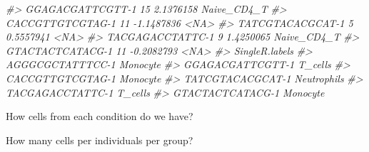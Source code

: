 \documentclass[
]{book}
\newenvironment{Shaded}{\begin{snugshade}}{\end{snugshade}}
\newcommand{\CommentTok}[1]{\textcolor[rgb]{0.56,0.35,0.01}{\textit{#1}}}
\newcommand{\FunctionTok}[1]{\textcolor[rgb]{0.13,0.29,0.53}{\textbf{#1}}}
\newcommand{\NormalTok}[1]{#1}
\newcommand{\SpecialCharTok}[1]{\textcolor[rgb]{0.81,0.36,0.00}{\textbf{#1}}}
\begin{document}
\begin{Shaded}
\begin{Highlighting}[]
\CommentTok{\#\textgreater{} GGAGACGATTCGTT{-}1            15    2.1376158 Naive\_CD4\_T}
\CommentTok{\#\textgreater{} CACCGTTGTCGTAG{-}1            11   {-}1.1487836        \textless{}NA\textgreater{}}
\CommentTok{\#\textgreater{} TATCGTACACGCAT{-}1             5    0.5557941        \textless{}NA\textgreater{}}
\CommentTok{\#\textgreater{} TACGAGACCTATTC{-}1             9    1.4250065 Naive\_CD4\_T}
\CommentTok{\#\textgreater{} GTACTACTCATACG{-}1            11   {-}0.2082793        \textless{}NA\textgreater{}}
\CommentTok{\#\textgreater{}                  SingleR.labels}
\CommentTok{\#\textgreater{} AGGGCGCTATTTCC{-}1       Monocyte}
\CommentTok{\#\textgreater{} GGAGACGATTCGTT{-}1        T\_cells}
\CommentTok{\#\textgreater{} CACCGTTGTCGTAG{-}1       Monocyte}
\CommentTok{\#\textgreater{} TATCGTACACGCAT{-}1    Neutrophils}
\CommentTok{\#\textgreater{} TACGAGACCTATTC{-}1        T\_cells}
\CommentTok{\#\textgreater{} GTACTACTCATACG{-}1       Monocyte}
\end{Highlighting}
\end{Shaded}

How cells from each condition do we have?

\begin{Shaded}
\end{Shaded}

How many cells per individuals per group?

\begin{Shaded}
\end{Shaded}
\end{document}
